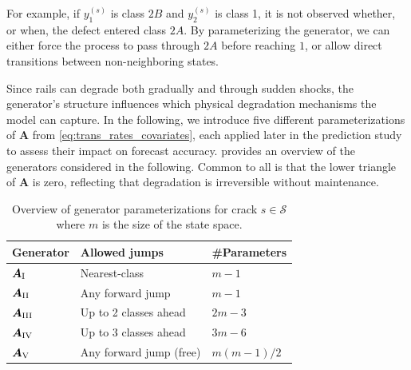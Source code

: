 For example, if $y_1^{(s)}$ is class $2B$ and $y_2^{(s)}$ is class 1, it is not observed whether, or when, the defect entered class $2A$. By parameterizing the generator, we can either force the process to pass through $2A$ before reaching $1$, or allow direct transitions between non-neighboring states. 

Since rails can degrade both gradually and through sudden shocks, the generator’s structure influences which physical degradation mechanisms the model can capture. In the following, we introduce five different parameterizations of $\bm{A}$ from \cref{eq:trans_rates_covariates}, each applied later in the prediction study to assess their impact on forecast accuracy.  provides an overview of the generators considered in the following. Common to all is that the lower triangle of $\bm{A}$ is zero, reflecting that degradation is irreversible without maintenance.

\begin{table}[htb!]
\centering
\caption{Overview of generator parameterizations for crack $s \in \mathcal{S}$ where $m$ is the size of the state space.}
\label{tab:generators_overview}
\begin{tabular}{@{}lll@{}}
\toprule
Generator & Allowed jumps & \#Parameters \\%
\midrule
$\bm{A}_{\RN{1}}$ & Nearest-class & $m - 1$ \\%
$\bm{A}_{\RN{2}}$ & Any forward jump & $m - 1$ \\%
$\bm{A}_{\RN{3}}$ & Up to 2 classes ahead & $2m - 3$ \\%
$\bm{A}_{\RN{4}}$ & Up to 3 classes ahead & $3m - 6$ \\%
$\bm{A}_{\RN{5}}$ & Any forward jump (free) & $m(m-1)/2$ \\%
\bottomrule
\end{tabular}
\end{table}

\FloatBarrier

